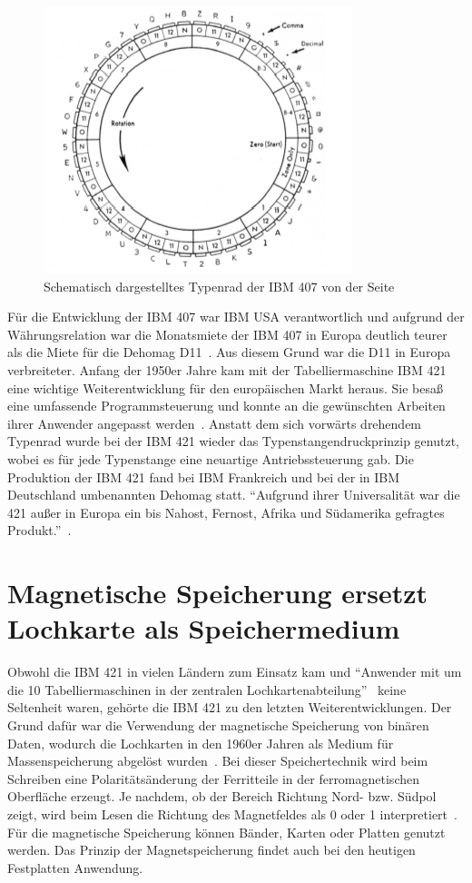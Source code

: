 \documentclass[parskip=half]{scrartcl}
\begin{document}
\begin{figure}[h]
  \centering
  \includegraphics{typenrad}
  \caption{Schematisch dargestelltes Typenrad der IBM 407 von der Seite~\cite{sandner}}
  \label{fig:typenrad}
\end{figure}

Für die Entwicklung der IBM 407 war IBM USA verantwortlich und aufgrund der
Währungsrelation war die Monatsmiete der IBM 407 in Europa deutlich teurer als
die Miete für die Dehomag D11~\cite{sandner}. Aus diesem Grund war
die D11 in Europa verbreiteter. Anfang der 1950er Jahre kam mit der
Tabelliermaschine IBM 421 eine wichtige Weiterentwicklung für den europäischen
Markt heraus. Sie besaß eine umfassende Programmsteuerung und konnte an die
gewünschten Arbeiten ihrer Anwender angepasst werden~\cite{deutschesMuseum}.
Anstatt dem sich vorwärts drehendem Typenrad wurde bei der IBM 421 wieder das
Typenstangendruckprinzip genutzt, wobei es für jede Typenstange eine neuartige
Antriebssteuerung gab. Die Produktion der IBM 421 fand bei IBM Frankreich und
bei der in IBM Deutschland umbenannten Dehomag statt. \enquote{Aufgrund ihrer
Universalität war die 421 außer in Europa ein bis Nahost, Fernost, Afrika und
Südamerika gefragtes Produkt.}~\cite{sandner}.

\section{Magnetische Speicherung ersetzt Lochkarte als Speichermedium}

Obwohl die IBM 421 in vielen Ländern zum Einsatz kam und \enquote{Anwender mit um die
10 Tabelliermaschinen in der zentralen Lochkartenabteilung}~\cite{sandner} keine Seltenheit waren, gehörte die IBM 421 zu den letzten
Weiterentwicklungen. Der Grund dafür war die Verwendung der magnetische
Speicherung von binären Daten, wodurch die Lochkarten in den 1960er Jahren als
Medium für Massenspeicherung abgelöst wurden~\cite{gronau2009}. Bei
dieser Speichertechnik wird beim Schreiben eine Polaritätsänderung der
Ferritteile in der  ferromagnetischen Oberfläche erzeugt. Je nachdem, ob der
Bereich Richtung Nord- bzw. Südpol zeigt, wird beim Lesen die Richtung des
Magnetfeldes als 0 oder 1 interpretiert~\cite{gronau2009}. Für die
magnetische Speicherung können Bänder, Karten oder Platten genutzt werden. Das
Prinzip der Magnetspeicherung findet auch bei den heutigen Festplatten
Anwendung.
\end{document}

